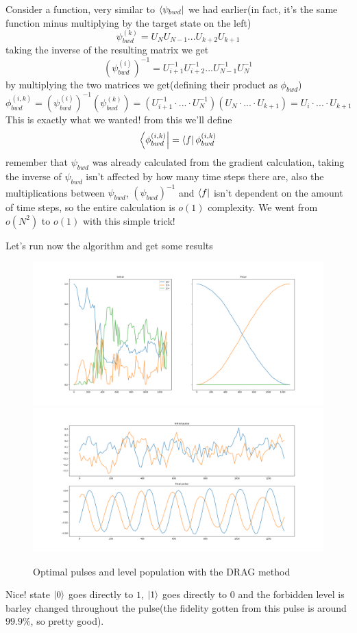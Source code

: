 \documentclass[english, a4paper, 12pt, twoside]{article}
\numberwithin{equation}{section} %
\begin{document}
Consider a function, very similar to  $\bra{\psi_{bwd}}$ we had earlier(in fact, it's the same function minus multiplying by the target state on the left)
\[
    \psi_{bwd}^{(k)} = U_NU_{N-1}...U_{k+2}U_{k+1}
\]
taking the inverse of the resulting matrix we get
\[
    (\psi_{bwd}^{(i)})^{-1} = U_{i+1}^{-1}U_{i+2}^{-1}...U_{N-1}^{-1}U_{N}^{-1}
\]
by multiplying the two matrices we get(defining their product as $\phi_{bwd}$)
\[
    \phi_{bwd}^{(i,k)} = (\psi_{bwd}^{(i)})^{-1}(\psi_{bwd}^{(k)}) = (U_{i+1}^{-1}\cdot...\cdot U_{N}^{-1})(U_N\cdot...\cdot U_{k+1}) = U_{i}\cdot...\cdot U_{k+1}
\]
This is exactly what we wanted! from this we'll define
\[
    \bra{\phi_{bwd}^{(i,k)}} = \bra{f}\phi_{bwd}^{(i,k)}
\]
remember that $\psi_{bwd}$ was already calculated from the gradient calculation, taking the inverse of $\psi_{bwd}$ isn't affected by how many time steps there are, also the multiplications between $\psi_{bwd}$, $(\psi_{bwd})^{-1}$ and $\bra{f}$ isn't dependent on the amount of time steps, so the entire calculation is $o(1)$ complexity. We went from $o(N^2)$ to $o(1)$ with this simple trick!

Let's run now the algorithm and get some results
\begin{figure}[H]
    \centering
    \caption{Optimal pulses and level population with the DRAG method}
    \includegraphics[width=1\columnwidth]{Results/DRAG/Population-Low-Quality.png}
    \includegraphics[width=1\columnwidth]{Results/DRAG/pulses-Low-Quality.png}
    \label{fig:sDRAG-results}
\end{figure}
Nice! state $\ket{0}$ goes directly to $1$, $\ket{1}$ goes directly to $0$ and the forbidden level is barley changed throughout the pulse(the fidelity gotten from this pulse is around $99.9\%$, so pretty good).
\end{document}
